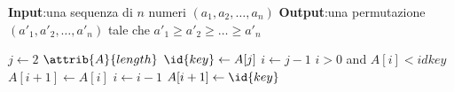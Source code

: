 \textbf{Input}:una sequenza di $n$ numeri $(a_1,a_2,\dots,a_n)$ \newline
\textbf{Output}:una permutazione $(a'_1,a'_2,\dots,a'_n)$ tale che $a'_1 \geq a'_2 \geq \dots \geq a'_n$

\begin{codebox}
\li \For $j \gets 2$ \To $\attrib{A}{length}$
    \Do
\li            $\id{key} \gets A[j]$
\li         $i \gets j-1$
\li         \While $i > 0$ and $A[i] < id{key}$
            \Do
\li                $A[i+1] \gets A[i]$
\li                $i \gets i-1$
            \End
\li         $A[i+1] \gets \id{key}$
    \End
\end{codebox}
